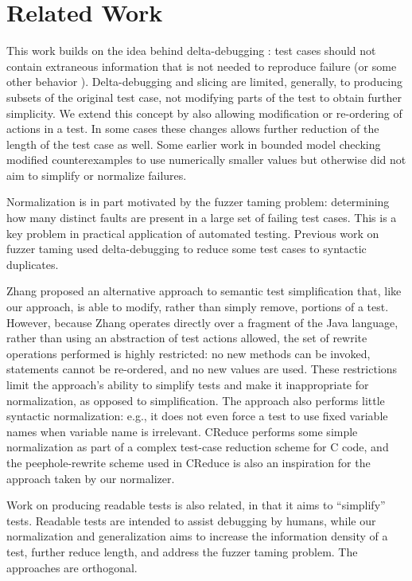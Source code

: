 \section{Related Work}

This work builds on the idea behind delta-debugging \cite{DD}: test
cases should not contain extraneous information that is not needed to
reproduce failure (or some other behavior \cite{icst2014,stvrcausereduce}).  Delta-debugging and slicing
\cite{TCminim} are limited, generally, to producing subsets of the
original test case, not modifying parts of the test to obtain further
simplicity.  We extend this concept by also allowing modification or
re-ordering of actions in a test.  In some cases these changes
allows further reduction of the length of the test case as well.  Some
earlier work in bounded model checking modified counterexamples to use
numerically smaller values \cite{MakeMost} but otherwise did not aim
to simplify or normalize failures.

Normalization is in part motivated by the fuzzer taming \cite{PLDI13}
problem: determining how many distinct faults are present in a large
set of failing test cases.  This is a key problem in practical
application of automated testing.  Previous work on fuzzer taming
\cite{PLDI13} used delta-debugging to reduce some test cases to
syntactic duplicates.

Zhang \cite{SaiSimple} proposed an alternative approach to semantic
test simplification that, like our approach, is able to modify, rather
than simply remove, portions of a test.  However, because Zhang
operates directly over a fragment of the Java language, rather than
using an abstraction of test actions allowed, the set of rewrite
operations performed is highly restricted: no new methods can be
invoked, statements cannot be re-ordered, and no new values are used.
These restrictions limit the approach's ability to simplify tests and
make it inappropriate for  normalization, as opposed to simplification.  The approach also performs little
syntactic normalization: e.g., it does not even force a test to use
fixed variable names when variable name is irrelevant.  CReduce
\cite{CReduce} performs some simple normalization as part of a complex
test-case reduction scheme for C code, and the peephole-rewrite scheme
used in CReduce is also an inspiration for the approach taken by our
normalizer.

Work on producing readable tests \cite{Guava,Readable} is also
related, in that it aims to ``simplify'' tests.  Readable tests are
intended to assist debugging by humans, while our
normalization and generalization aims to increase the information
density of a test, further reduce length, and address the fuzzer taming problem.  The approaches are
orthogonal.

